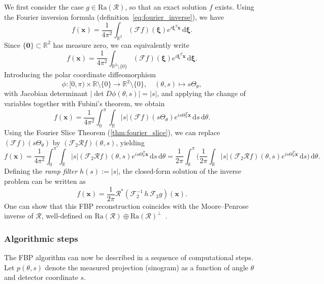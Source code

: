 \documentclass[12pt,a4paper]{article}
\begin{document}
We first consider the case $g \in \mathrm{Ra}(\mathcal{R})$, so that an exact solution $f$ exists. Using the Fourier inversion formula (definition~\ref{eq:fourier_inverse}), we have
\[
    f(\mathbf{x}) = \frac{1}{4\pi^2} \int_{\mathbb{R}^2} (\mathcal{F} f)(\boldsymbol{\xi}) e^{i \boldsymbol{\xi}^T \mathbf{x}} \, \mathrm{d}\boldsymbol{\xi}.
\]
Since $\{\mathbf{0}\} \subset \mathbb R^2$ has measure zero, we can equivalently write
\[
    f(\mathbf{x}) = \frac{1}{4\pi^2} \int_{\mathbb{R}^2 \setminus \{0\}} (\mathcal{F} f)(\boldsymbol{\xi}) e^{i \boldsymbol{\xi}^T \mathbf{x}} \, \mathrm{d}\boldsymbol{\xi}.
\]
Introducing the polar coordinate diffeomorphism
\[
    \phi : [0, \pi) \times \mathbb{R} \setminus \{0\} \longrightarrow \mathbb{R}^2 \setminus \{0\}, \quad (\theta, s) \mapsto s \Theta_\theta,
\]
with Jacobian determinant $|\det D\phi(\theta, s)| = |s|$, and applying the change of variables together with Fubini's theorem, we obtain
\[
    f(\mathbf{x}) = \frac{1}{4\pi^2} \int_0^\pi \int_\mathbb{R} |s| (\mathcal{F} f)(s \Theta_\theta) e^{i s \Theta_\theta^T \mathbf{x}} \, \mathrm{d}s \, \mathrm{d}\theta.
\]
Using the Fourier Slice Theorem (\ref{thm:fourier_slice}), we can replace $(\mathcal{F} f)(s \Theta_\theta)$ by $(\mathcal{F}_2 \mathcal{R} f)(\theta, s)$, yielding
\[
    f(\mathbf{x}) = \frac{1}{4\pi^2} \int_0^\pi \int_\mathbb{R} |s| (\mathcal{F}_2 \mathcal{R} f)(\theta, s) e^{i s \Theta_\theta^T \mathbf{x}} \, \mathrm{d}s \, \mathrm{d}\theta
    = \frac{1}{2\pi} \int_0^\pi \Big( \frac{1}{2\pi} \int_\mathbb{R} |s| (\mathcal{F}_2 \mathcal{R} f)(\theta, s) e^{i s \Theta_\theta^T \mathbf{x}} \, \mathrm{d}s \Big) \, \mathrm{d}\theta.
\]
Defining the \emph{ramp filter} $h(s) := |s|$, the closed-form solution of the inverse problem can be written as
\begin{equation}
\label{FBP}
    f(\mathbf{x}) = \frac{1}{2\pi} \mathcal{R}^* (\mathcal{F}_2^{-1} \, h \, \mathcal{F}_2 g)(\mathbf{x}).
\end{equation}
One can show that this FBP reconstruction coincides with the Moore--Penrose inverse of $\mathcal{R}$, well-defined on $\mathrm{Ra}(\mathcal{R}) \oplus \mathrm{Ra}(\mathcal{R})^\perp$~\cite{math_of_ct}.

\subsubsection{Algorithmic steps}

The FBP algorithm can now be described in a sequence of computational steps. Let $p(\theta, s)$ denote the measured projection (sinogram) as a function of angle $\theta$ and detector coordinate $s$.
\end{document}
